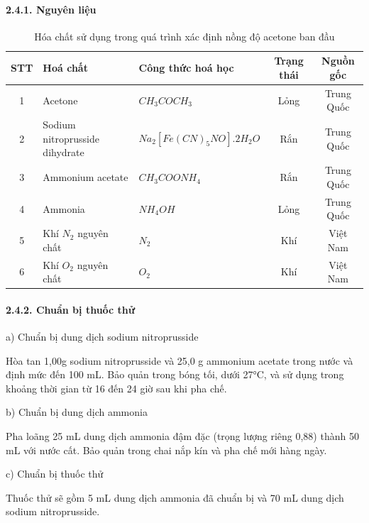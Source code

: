 \documentclass{article} %
\begin{document}
\paragraph*{2.4.1. Nguyên liệu}
\leavevmode

\begin{table}[H]
    \centering
    \begin{tabular}{@{}|c|p{3cm}|p{4.75cm}|c|c|@{}} \hline
        \textbf{STT} & \centering \textbf{Hoá chất} & \centering \textbf{Công thức hoá học} & \textbf{Trạng thái} & \textbf{Nguồn gốc}\\ \hline
        1 & \centering Acetone & \centering $CH_3COCH_3$ & Lỏng & Trung Quốc\\ \hline
        2 & \centering Sodium nitroprusside dihydrate & \centering $Na_2[Fe(CN)_5NO].2H_2O$ & Rắn & Trung Quốc\\ \hline
        3 & \centering Ammonium acetate & \centering $CH_3COONH_4$ & Rắn & Trung Quốc\\ \hline
        4 & \centering Ammonia & \centering $NH_4OH$ & Lỏng & Trung Quốc\\ \hline
        5 & \centering Khí $N_2$ nguyên chất & \centering $N_2$ & Khí & Việt Nam\\ \hline
        6 & \centering Khí $O_2$ nguyên chất & \centering $O_2$ & Khí & Việt Nam\\ \hline
    \end{tabular}
    \caption{\centering Hóa chất sử dụng trong quá trình xác định nồng độ acetone ban đầu}
\end{table}

\paragraph*{2.4.2. Chuẩn bị thuốc thử}
\leavevmode

a) Chuẩn bị dung dịch sodium nitroprusside

Hòa tan 1,00g sodium nitroprusside và 25,0 g ammonium acetate trong nước và định mức đến 100 mL. Bảo quản trong bóng tối, dưới 27°C, và sử dụng trong khoảng thời gian từ 16 đến 24 giờ sau khi pha chế.

b) Chuẩn bị dung dịch ammonia

Pha loãng 25 mL dung dịch ammonia đậm đặc (trọng lượng riêng 0,88) thành 50 mL với nước cất. Bảo quản trong chai nắp kín và pha chế mới hàng ngày.

c) Chuẩn bị thuốc thử

Thuốc thử sẽ gồm 5 mL dung dịch ammonia đã chuẩn bị và 70 mL dung dịch sodium nitroprusside.
\end{document}
